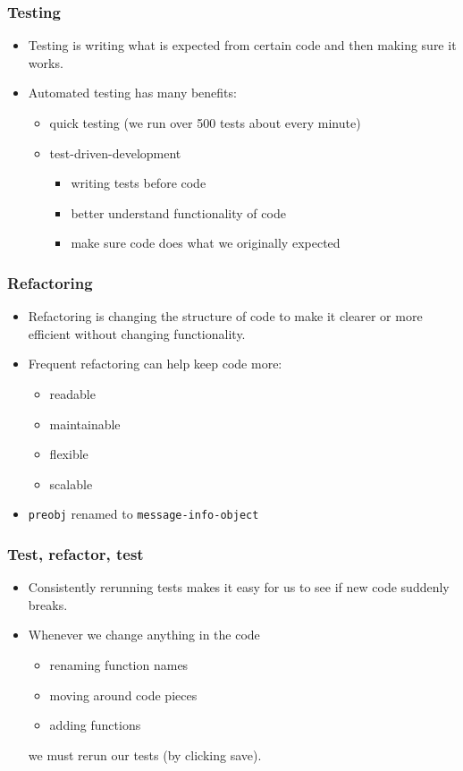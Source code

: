 \documentclass{beamer}
\begin{document}
\begin{frame}[fragile]
\frametitle{Testing}

\begin{itemize}
\item Testing is writing what is expected from certain code and then making sure it works.
\item Automated testing has many benefits:
\begin{itemize}
\item quick testing (we run over 500 tests about every minute)
\item test-driven-development
\begin{itemize}
\item writing tests before code
\item better understand functionality of code
\item make sure code does what we originally expected
\end{itemize}
\end{itemize}
\end{itemize}	
\end{frame}

\begin{frame}[fragile]
\frametitle{Refactoring}
\begin{itemize}
\item Refactoring is changing the structure of code to make it clearer or more efficient  without changing functionality.
\item Frequent refactoring can help keep code more: 
\begin{itemize}
\item readable
\item maintainable
\item flexible
\item scalable
\end{itemize}
\item {\tt preobj} renamed to {\tt message-info-object}
\end{itemize}	
\end{frame}

\begin{frame}[fragile]
\frametitle{Test, refactor, test}
\begin{itemize}
\item Consistently rerunning tests makes it easy for us to see if new code suddenly breaks.
\item Whenever we change anything in the code
\begin{itemize}
\item renaming function names
\item moving around code pieces
\item adding functions
\end{itemize}
we must rerun our tests (by clicking save).
\end{itemize}		
\end{frame}
\end{document}
